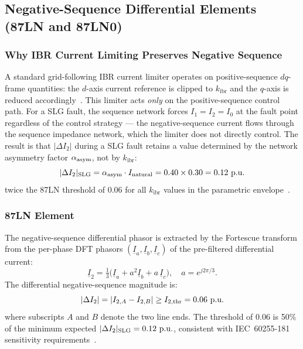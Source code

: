\documentclass[journal,twoside,10pt]{IEEEtran}
\newcommand{\kibr}{k_{\mathrm{ibr}}}
\newcommand{\pu}{\,\text{p.u.}}
\begin{document}
\subsection{Negative-Sequence Differential Elements (87LN and 87LN0)}
\label{sec:seqelems}

\subsubsection{Why IBR Current Limiting Preserves Negative Sequence}

A standard grid-following IBR current limiter operates on positive-sequence
$dq$-frame quantities: the $d$-axis current reference is clipped to
$\kibr$ and the $q$-axis is reduced accordingly~\cite{Plet2011,Strezoski2017}.
This limiter acts \emph{only} on the positive-sequence control path.
For a SLG fault, the sequence network forces $I_1 = I_2 = I_0$ at the fault
point regardless of the control strategy --- the negative-sequence current
flows through the sequence impedance network, which the limiter does not
directly control.
The result is that $|\Delta I_2|$ during a SLG fault retains a value
determined by the network asymmetry factor $\alpha_{\rm asym}$, not by
$\kibr$:
\begin{equation}
  |\Delta I_2|_{\rm SLG} = \alpha_{\rm asym} \cdot I_{\rm natural}
  = 0.40 \times 0.30 = 0.12\,\pu
  \label{eq:ns_quant}
\end{equation}
twice the 87LN threshold of 0.06\,\pu for all $\kibr$ values in the
parametric envelope~\cite{SAMBP_TR22,Kasztenny2010}.

\subsubsection{87LN Element}

The negative-sequence differential phasor is extracted by the Fortescue
transform from the per-phase DFT phasors $(\underline{I}_a, \underline{I}_b,
\underline{I}_c)$ of the pre-filtered differential current:
\begin{equation}
  \underline{I}_2 = \tfrac{1}{3}\bigl(
    \underline{I}_a + a^2\underline{I}_b + a\,\underline{I}_c\bigr),
  \quad a = e^{j2\pi/3}.
  \label{eq:fortescue}
\end{equation}
The differential negative-sequence magnitude is:
\begin{equation}
  |\Delta I_2| = |{I}_{2,A} - {I}_{2,B}| \geq I_{2,\rm thr} = 0.06\,\pu
  \label{eq:87LN}
\end{equation}
where subscripts $A$ and $B$ denote the two line ends.
The threshold of 0.06\,\pu is 50\% of the minimum expected
$|\Delta I_2|_{\rm SLG} = 0.12\,\pu$, consistent with IEC~60255-181
sensitivity requirements~\cite{IEC_60255_181}.
\end{document}
